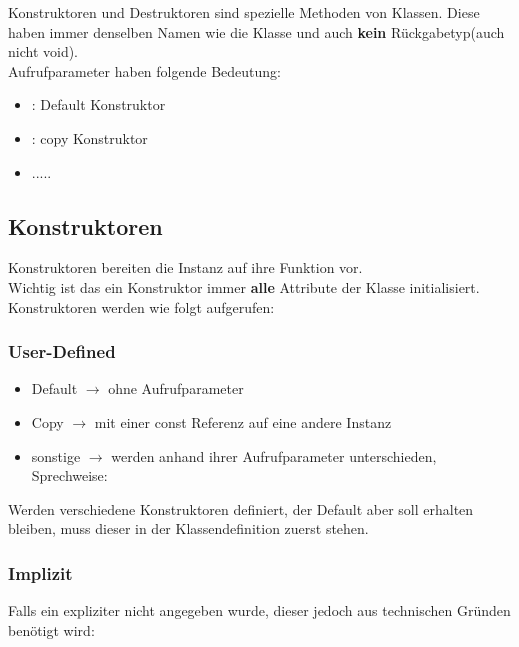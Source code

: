 Konstruktoren und Destruktoren sind spezielle Methoden von Klassen. 
Diese haben immer denselben Namen wie die Klasse und auch \textbf{kein} Rückgabetyp(auch nicht void).\\
Aufrufparameter haben folgende Bedeutung:

\begin{itemize}[itemsep=1pt, parsep=0pt]
    \item \textbf{} : Default Konstruktor
    \item \textbf{} : copy Konstruktor
    \item .....
\end{itemize}

\subsection{Konstruktoren}

Konstruktoren bereiten die Instanz auf ihre Funktion vor. \\

Wichtig ist das ein Konstruktor immer \textbf{alle} Attribute der Klasse initialisiert.
Konstruktoren werden wie folgt aufgerufen:\\

\subsubsection{User-Defined}

\begin{itemize}[itemsep=1pt, parsep=0pt]
    \item Default $\rightarrow$ ohne Aufrufparameter
    \item Copy $\rightarrow$ mit einer const Referenz auf eine andere Instanz
    \item sonstige $\rightarrow$ werden anhand ihrer Aufrufparameter unterschieden, Sprechweise:
\end{itemize}

Werden verschiedene Konstruktoren definiert, der Default aber soll erhalten bleiben, muss dieser in der Klassendefinition zuerst stehen.\\


\subsubsection{Implizit}

Falls ein expliziter nicht angegeben wurde, dieser jedoch aus technischen Gründen benötigt wird:

